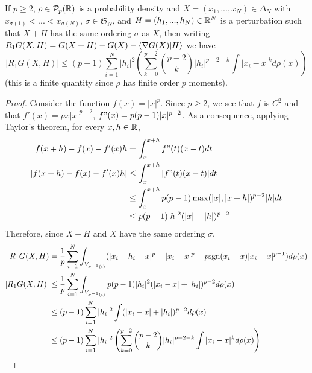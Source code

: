 \begin{lemma}
    \label{lm:lemma_1}
    If $p \geq 2$, $\rho \in \mathcal{P}_p(\mathbb R)$ is a probability density and $X = (x_1,...,x_N) \in \Delta_N$ with $x_{\sigma(1)} < ... < x_{\sigma(N)}$, $\sigma \in \mathfrak{S}_N$, and $H = (h_1,...,h_N) \in \mathbb R^N$ is a perturbation such that $X+H$ has the same ordering $\sigma$ as $X$, then writing $R_1 G(X,H) = G(X+H) - G(X) - \langle\nabla G(X)|H\rangle$ we have
    \begin{equation}
        |R_1 G(X,H)| \leq (p-1) \sum_{i=1}^N |h_i|^2\left(\sum_{k=0}^{p-2} \binom{p-2}{k} |h_i|^{p-2-k} \int |x_i - x|^k d\rho(x) \right)
    \end{equation}
    (this is a finite quantity since $\rho$ has finite order $p$ moments).
\end{lemma}

\begin{proof}
    Consider the function $f(x) = |x|^p$. Since $p \geq 2$, we see that $f$ is $C^2$ and that $f'(x) = px|x|^{p-2}$, $f"(x) = p(p-1)|x|^{p-2}$. As a consequence, applying Taylor's theorem, for every $x,h \in \mathbb R$,
    \begin{align}
        f(x+h) - f(x) - f'(x)h &= \int_{x}^{x+h} f"(t)(x-t)dt \\
        |f(x+h) - f(x) - f'(x)h| &\leq \int_{x}^{x+h} |f"(t)(x-t)|dt \\
            &\leq \int_{x}^{x+h} p(p-1) \max(|x|,|x+h|)^{p-2}|h|dt \\
            &\leq p(p-1) |h|^2 (|x|+|h|)^{p-2} \\
    \end{align}
    Therefore, since $X+H$ and $X$ have the same ordering $\sigma$, 
    \begin{align}
        R_1 G(X,H)
            &= \frac{1}{p} \sum_{i=1}^N \int_{V_{\sigma^{-1}(i)}} (|x_i + h_i - x|^p - |x_i - x|^p - p\mathrm{sgn}(x_i - x)|x_i - x|^{p-1}) d\rho(x) \\
        |R_1 G(X,H)| 
            &\leq \frac{1}{p}\sum_{i=1}^N \int_{V_{\sigma^{-1}(i)}} p(p-1) |h_i|^2 (|x_i - x|+|h_i|)^{p-2} d\rho(x) \\
            &\leq (p-1) \sum_{i=1}^N |h_i|^2 \int (|x_i - x|+|h_i|)^{p-2} d\rho(x) \\
            &\leq (p-1) \sum_{i=1}^N |h_i|^2\left(\sum_{k=0}^{p-2} \binom{p-2}{k} |h_i|^{p-2-k} \int |x_i - x|^k d\rho(x) \right)
    \end{align}
\end{proof}

